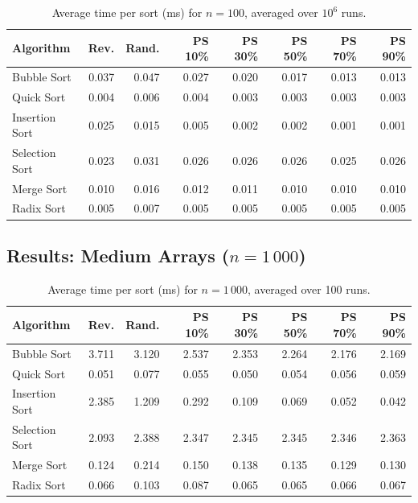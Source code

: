 \documentclass[11pt,a4paper]{article}
\begin{document}
\begin{table}[H]
\centering
\caption{Average time per sort (ms) for $n=100$, averaged over $10^6$ runs.}
\label{tab:small}
\begin{tabular}{lrrrrrrr}
\toprule
\textbf{Algorithm} & \textbf{Rev.} & \textbf{Rand.} & \textbf{PS 10\%} & \textbf{PS 30\%} & \textbf{PS 50\%} & \textbf{PS 70\%} & \textbf{PS 90\%} \\
\midrule
Bubble Sort    & 0.037 & 0.047 & 0.027 & 0.020 & 0.017 & 0.013 & 0.013 \\
Quick Sort     & 0.004 & 0.006 & 0.004 & 0.003 & 0.003 & 0.003 & 0.003 \\
Insertion Sort & 0.025 & 0.015 & 0.005 & 0.002 & 0.002 & 0.001 & 0.001 \\
Selection Sort & 0.023 & 0.031 & 0.026 & 0.026 & 0.026 & 0.025 & 0.026 \\
Merge Sort     & 0.010 & 0.016 & 0.012 & 0.011 & 0.010 & 0.010 & 0.010 \\
Radix Sort     & 0.005 & 0.007 & 0.005 & 0.005 & 0.005 & 0.005 & 0.005 \\
\bottomrule
\end{tabular}
\end{table}

\subsection{Results: Medium Arrays ($n = 1\,000$)}

\begin{table}[H]
\centering
\caption{Average time per sort (ms) for $n=1\,000$, averaged over 100 runs.}
\label{tab:medium}
\begin{tabular}{lrrrrrrr}
\toprule
\textbf{Algorithm} & \textbf{Rev.} & \textbf{Rand.} & \textbf{PS 10\%} & \textbf{PS 30\%} & \textbf{PS 50\%} & \textbf{PS 70\%} & \textbf{PS 90\%} \\
\midrule
Bubble Sort    & 3.711 & 3.120 & 2.537 & 2.353 & 2.264 & 2.176 & 2.169 \\
Quick Sort     & 0.051 & 0.077 & 0.055 & 0.050 & 0.054 & 0.056 & 0.059 \\
Insertion Sort & 2.385 & 1.209 & 0.292 & 0.109 & 0.069 & 0.052 & 0.042 \\
Selection Sort & 2.093 & 2.388 & 2.347 & 2.345 & 2.345 & 2.346 & 2.363 \\
Merge Sort     & 0.124 & 0.214 & 0.150 & 0.138 & 0.135 & 0.129 & 0.130 \\
Radix Sort     & 0.066 & 0.103 & 0.087 & 0.065 & 0.065 & 0.066 & 0.067 \\
\bottomrule
\end{tabular}
\end{table}
\end{document}
